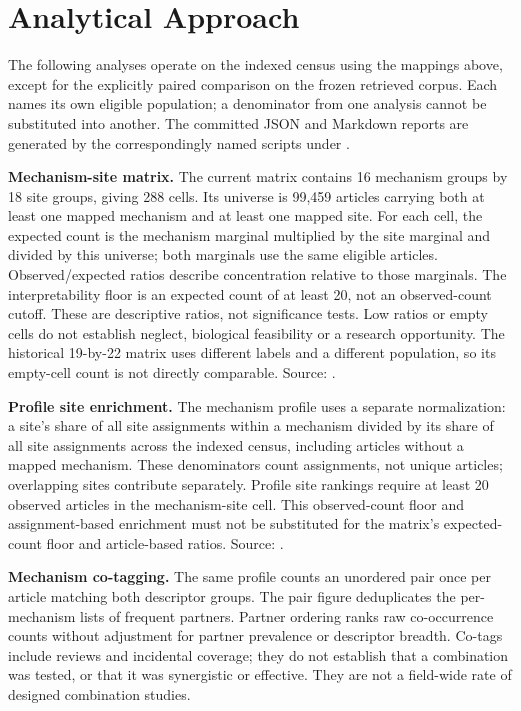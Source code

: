 \documentclass[11pt,twoside,openright]{report}
\begin{document}
\section{Analytical Approach}

The following analyses operate on the indexed census using the mappings above, except for the explicitly paired comparison on the frozen retrieved corpus. Each names its own eligible population; a denominator from one analysis cannot be substituted into another. The committed JSON and Markdown reports are generated by the correspondingly named scripts under .

\textbf{Mechanism-site matrix.} The current matrix contains 16 mechanism groups by 18 site groups, giving 288 cells. Its universe is 99,459 articles carrying both at least one mapped mechanism and at least one mapped site. For each cell, the expected count is the mechanism marginal multiplied by the site marginal and divided by this universe; both marginals use the same eligible articles. Observed/expected ratios describe concentration relative to those marginals. The interpretability floor is an expected count of at least 20, not an observed-count cutoff. These are descriptive ratios, not significance tests. Low ratios or empty cells do not establish neglect, biological feasibility or a research opportunity. The historical 19-by-22 matrix uses different labels and a different population, so its empty-cell count is not directly comparable. Source: .

\textbf{Profile site enrichment.} The mechanism profile uses a separate normalization: a site's share of all site assignments within a mechanism divided by its share of all site assignments across the indexed census, including articles without a mapped mechanism. These denominators count assignments, not unique articles; overlapping sites contribute separately. Profile site rankings require at least 20 observed articles in the mechanism-site cell. This observed-count floor and assignment-based enrichment must not be substituted for the matrix's expected-count floor and article-based ratios. Source: .

\textbf{Mechanism co-tagging.} The same profile counts an unordered pair once per article matching both descriptor groups. The pair figure deduplicates the per-mechanism lists of frequent partners. Partner ordering ranks raw co-occurrence counts without adjustment for partner prevalence or descriptor breadth. Co-tags include reviews and incidental coverage; they do not establish that a combination was tested, or that it was synergistic or effective. They are not a field-wide rate of designed combination studies.
\end{document}
